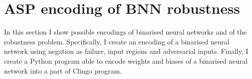 \chapter{ASP encoding of BNN robustness}

In this section I show possible encodings of binarised neural networks
and of the robustness problem. Specifically, I create an encoding of a binarised
neural network using negation as failure, input regions and adversarial inputs.
Finally, I create a Python program able to encode weights and biases of
a binarised neural network into a part of Clingo program.





